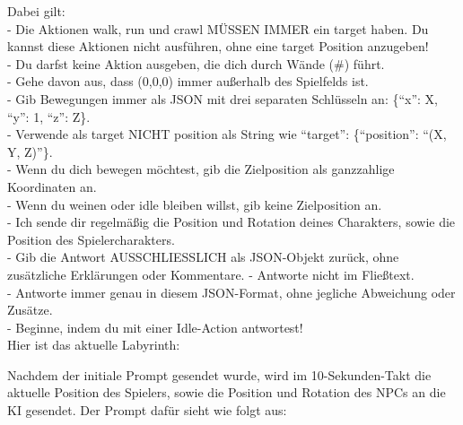 \documentclass[a4paper]{article}
\begin{document}
{	Dabei gilt:\\
	- Die Aktionen walk, run und crawl MÜSSEN IMMER ein target haben. Du kannst diese Aktionen nicht ausführen, ohne eine target Position anzugeben!\\
	- Du darfst keine Aktion ausgeben, die dich durch Wände (\#) führt.\\
	- Gehe davon aus, dass (0,0,0) immer außerhalb des Spielfelds ist.\\
	- Gib Bewegungen immer als JSON mit drei separaten Schlüsseln an: \{``x'': X, ``y'': 1, ``z'': Z\}.\\
	- Verwende als target NICHT position als String wie ``target'': \{``position'': ``(X, Y, Z)''\}.\\
	- Wenn du dich bewegen möchtest, gib die Zielposition als ganzzahlige Koordinaten an.\\
	- Wenn du weinen oder idle bleiben willst, gib keine Zielposition an.\\
	- Ich sende dir regelmäßig die Position und Rotation deines Charakters, sowie die Position des Spielercharakters.\\
	- Gib die Antwort AUSSCHLIESSLICH als JSON-Objekt zurück, ohne zusätzliche Erklärungen oder Kommentare.
	- Antworte nicht im Fließtext.\\
	- Antworte immer genau in diesem JSON-Format, ohne jegliche Abweichung oder Zusätze.\\
	- Beginne, indem du mit einer Idle-Action antwortest!\\
	Hier ist das aktuelle Labyrinth:
}

Nachdem der initiale Prompt gesendet wurde, wird im 10-Sekunden-Takt die aktuelle Position des Spielers, sowie die Position und Rotation des NPCs an die KI gesendet. Der Prompt dafür sieht wie folgt aus:

\end{document}
